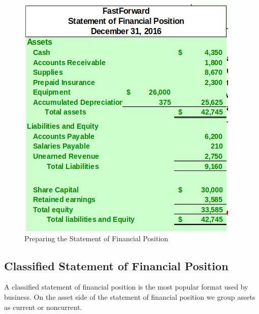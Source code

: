 \documentclass[../main.tex]{subfiles}
\begin{document}
\begin{enumerate}[noitemsep]
		\begin{figure}[ht!]
			\centering
			\includegraphics[width=0.80\columnwidth]{images/c4/statement_of_financial_position.png}
			\caption{Preparing the Statement of Financial Position}
		\end{figure}
		
	\end{enumerate}

	\subsection{Classified Statement of Financial Position}
	
	A classified statement of financial position is the most popular format 
	used by business. On the asset side of the statement of financial position 
	we group assets as current or noncurrent. 
	
\end{document}
